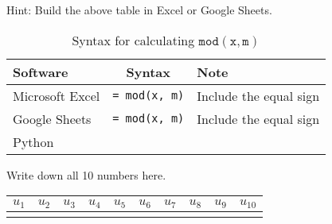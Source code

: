 \documentclass[../main.tex]{subfiles}
\begin{document}
\begin{example}
\begin{enumerate}
      Hint: Build the above table in Excel or Google Sheets.

      \begin{table}[H] %
        \centering

        \begin{tabular}{l|c|l}  %
          Software & Syntax & Note \\ %
          \midrule
          Microsoft Excel & \texttt{= mod(x, m)} & Include the equal sign \\
          Google Sheets & \texttt{= mod(x, m)} & Include the equal sign \\
          Python & \texttt{x %
        \end{tabular}
        \caption{Syntax for calculating \(\mathtt{mod(x,m)}\)}
        \label{table:syntax-modulo}
      \end{table}
  \end{enumerate}

  Write down all 10 numbers here.
  \begin{table}[H]
    \centering
    \begin{tabular}{l|l|l|l|l|l|l|l|l|l}  %
      \(u_{1}\) & \(u_{2}\) & \(u_{3}\) & \(u_{4}\) & \(u_{5}\) & \(u_{6}\) & \(u_{7}\) & \(u_{8}\) & \(u_{9}\) & \(u_{10}\) \\\midrule
                & & & & & & & & & \\[1ex]
    \end{tabular}
  \end{table}
\end{example}
\clearpage
\end{document}

